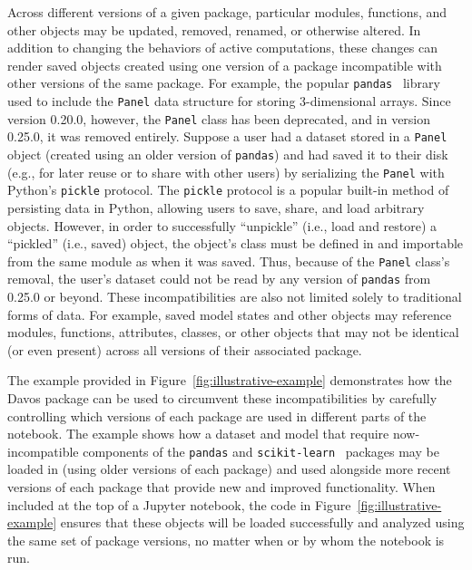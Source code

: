 \documentclass[preprint,12pt,a4paper]{elsarticle}
\begin{document}
Across different versions of a given package, particular modules, functions,
and other objects may be updated, removed, renamed, or otherwise altered. In
addition to changing the behaviors of active computations, these changes can
render saved objects created using one version of a package incompatible with
other versions of the same package. For example, the popular
\texttt{pandas}~\cite{McKi10} library used to include the \texttt{Panel} data
structure for storing 3-dimensional arrays. Since version 0.20.0, however, the
\texttt{Panel} class has been deprecated, and in version 0.25.0, it was removed
entirely. Suppose a user had a dataset stored in a \texttt{Panel} object
(created using an older version of \texttt{pandas}) and had saved it to their
disk (e.g., for later reuse or to share with other users) by serializing the
\texttt{Panel} with Python's \texttt{pickle} protocol. The \texttt{pickle}
protocol is a popular built-in method of persisting data in Python, allowing
users to save, share, and load arbitrary objects. However, in order to
successfully ``unpickle'' (i.e., load and restore) a ``pickled'' (i.e., saved)
object, the object's class must be defined in and importable from the same
module as when it was saved. Thus, because of the \texttt{Panel} class's
removal, the user's dataset could not be read by any version of \texttt{pandas}
from 0.25.0 or beyond. These incompatibilities are also not limited solely to
traditional forms of data. For example, saved model states and other objects
may reference modules, functions, attributes, classes, or other objects that
may not be identical (or even present) across all versions of their associated
package.

The example provided in Figure~\ref{fig:illustrative-example} demonstrates how
the Davos package can be used to circumvent these incompatibilities by
carefully controlling which versions of each package are used in different
parts of the notebook. The example shows how a dataset and model that require
now-incompatible components of the \texttt{pandas} and
\texttt{scikit-learn}~\cite{PedrEtal11} packages may be loaded in (using older
versions of each package) and used alongside more recent versions of each
package that provide new and improved functionality. When included at the top
of a Jupyter notebook, the code in Figure~\ref{fig:illustrative-example}
ensures that these objects will be loaded successfully and analyzed using the
same set of package versions, no matter when or by whom the notebook is run.
\end{document}
